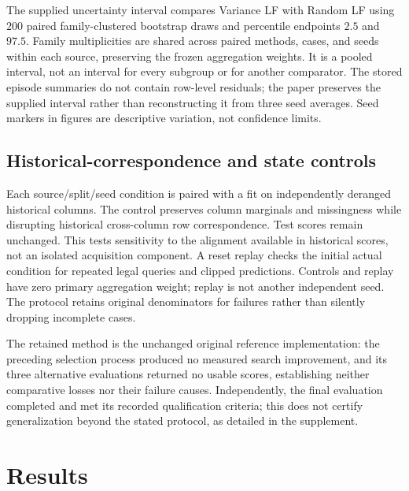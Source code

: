 \documentclass{article}
\begin{document}
The supplied uncertainty interval compares Variance LF with Random LF using $200$ paired family-clustered bootstrap draws and percentile endpoints $2.5$ and $97.5$. Family multiplicities are shared across paired methods, cases, and seeds within each source, preserving the frozen aggregation weights. It is a pooled interval, not an interval for every subgroup or for another comparator. The stored episode summaries do not contain row-level residuals; the paper preserves the supplied interval rather than reconstructing it from three seed averages. Seed markers in figures are descriptive variation, not confidence limits.

\subsection{Historical-correspondence and state controls}
Each source/split/seed condition is paired with a fit on independently deranged historical columns. The control preserves column marginals and missingness while disrupting historical cross-column row correspondence. Test scores remain unchanged. This tests sensitivity to the alignment available in historical scores, not an isolated acquisition component. A reset replay checks the initial actual condition for repeated legal queries and clipped predictions. Controls and replay have zero primary aggregation weight; replay is not another independent seed. The protocol retains original denominators for failures rather than silently dropping incomplete cases.

The retained method is the unchanged original reference implementation: the preceding selection process produced no measured search improvement, and its three alternative evaluations returned no usable scores, establishing neither comparative losses nor their failure causes. Independently, the final evaluation completed and met its recorded qualification criteria; this does not certify generalization beyond the stated protocol, as detailed in the supplement.

\section{Results}
\end{document}
